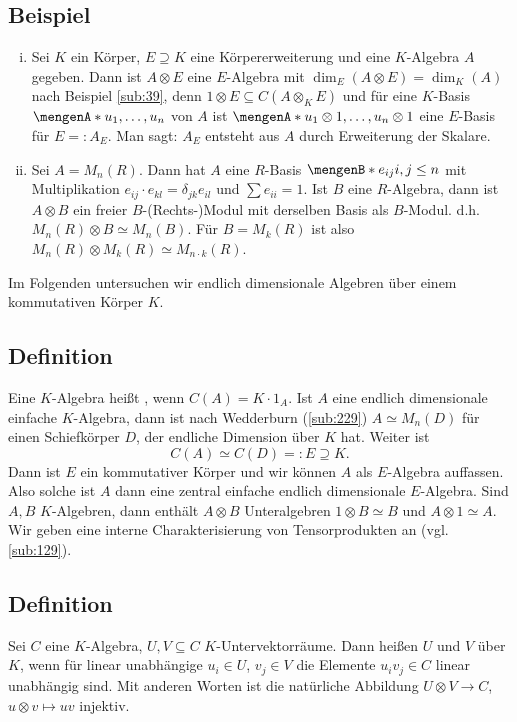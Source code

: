 \subsection[Beispiel: Erweiterung der Skalare]{Beispiel} %
\label{sub:314}
\begin{enumerate}[(i)]
	\item Sei $K$ ein Körper, $E \supseteq K$ eine Körpererweiterung und eine $K$-Algebra $A$ gegeben. Dann ist $A \otimes E$ eine $E$-Algebra mit 
	$\dim_E(A \otimes E)= \dim_K(A)$ nach Beispiel \ref{sub:39}, denn $1 \otimes E \subseteq C(A \otimes_K E)$ und für eine $K$-Basis $\set{u_1, \ldots , u_n}$ von $A$ ist 
	$\set{u_1 \otimes 1, \ldots , u_n \otimes 1} $ eine $E$-Basis für $E =: A_E$. Man sagt: $A_E$ entsteht aus $A$ durch Erweiterung der Skalare.
	\item Sei $A= M_n(R)$. Dann hat $A$ eine $R$-Basis $\set[e_{ij}]{i,j \le n}$ mit Multiplikation $e_{ij} \cdot e_{kl}= \delta_{jk} e_{il}$ und $\sum e_{ii} = 1$.
	Ist $B$ eine $R$-Algebra, dann ist $A \otimes B$ ein freier $B$-(Rechts-)Modul mit derselben Basis als $B$-Modul. d.h. $M_n(R) \otimes B \simeq M_n(B)$. Für $B=M_k(R)$
	ist also $M_n(R) \otimes M_k(R) \simeq M_{n \cdot k}(R)$.
\end{enumerate}
Im Folgenden untersuchen wir endlich dimensionale Algebren über einem kommutativen Körper $K$.

\subsection[Definition: Zentrale Algebra]{Definition} %
\label{sub:315}
Eine $K$-Algebra heißt , wenn $C(A)= K \cdot 1_A$. Ist $A$ eine endlich dimensionale einfache $K$-Algebra, dann ist nach Wedderburn (\ref{sub:229}) $A \simeq M_n(D)$ für einen Schiefkörper $D$, der endliche Dimension über $K$ hat. Weiter ist 
\[
	C(A) \simeq C(D) =: E \supseteq K.
\]
Dann ist $E$ ein kommutativer Körper und wir können $A$ als $E$-Algebra auffassen. Also solche ist $A$ dann eine zentral einfache endlich dimensionale $E$-Algebra.
Sind $A,B$ $K$-Algebren, dann enthält $A \otimes B$ Unteralgebren $1 \otimes B \simeq B$ und $A \otimes 1 \simeq A$. Wir geben eine interne Charakterisierung von
Tensorprodukten an (vgl. \ref{sub:129}). 

\subsection[Definition: Linear disjunkt]{Definition} %
\label{sub:316}
Sei $C$ eine $K$-Algebra, $U,V \subseteq C$ $K$-Untervektorräume. Dann heißen $U$ und $V$  über $K$, wenn für linear unabhängige $u_i \in U$, 
$v_j \in V$ die Elemente $u_i v_j \in C$ linear unabhängig sind. Mit anderen Worten ist die natürliche Abbildung $U  \otimes V \to C$, $u \otimes v \mapsto u v$ injektiv.

